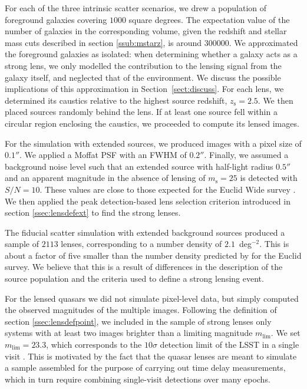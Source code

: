 \documentclass{aa}
\def\zsource{z_{\mathrm{s}}}
\def\msource{m_{\mathrm{s}}}
\def\Sref#1{Section~\ref{#1}\xspace}
\begin{document}
For each of the three intrinsic scatter scenarios, we drew a population of foreground galaxies covering $1000$ square degrees.
The expectation value of the number of galaxies in the corresponding volume, given the redshift and stellar mass cuts described in section \ref{ssub:mstarz}, is around $300000$.
We approximated the foreground galaxies as isolated: when determining whether a galaxy acts as a strong lens, we only modelled the contribution to the lensing signal from the galaxy itself, and neglected that of the environment.
We discuss the possible implications of this approximation in \Sref{sect:discuss}.
For each lens, we determined its caustics relative to the highest source redshift, $\zsource=2.5$. We then placed sources randomly behind the lens. If at least one source fell within a circular region enclosing the caustics, we proceeded to compute its lensed images.


For the simulation with extended sources, we produced images with a pixel size of $0.1''$.
We applied a Moffat PSF with an FWHM of $0.2''$.
Finally, we assumed a background noise level such that an extended source with half-light radius $0.5''$ and an apparent magnitude in the absence of lensing of $\msource=25$ is detected with $S/N=10$.
These values are close to those expected for the Euclid Wide survey \citep{Sca++22}.
%
We then applied the peak detection-based lens selection criterion introduced in section \ref{ssec:lensdefext} to find the strong lenses.

The fiducial scatter simulation with extended background sources produced a sample of $2113$ lenses, corresponding to a number density of $2.1$~deg$^{-2}$. This is about a factor of five smaller than the number density predicted by \citet{Col15} for the Euclid survey. We believe that this is a result of differences in the description of the source population and the criteria used to define a strong lensing event.

For the lensed quasars we did not simulate pixel-level data, but simply computed the observed magnitudes of the multiple images.
Following the definition of section \ref{ssec:lensdefpoint}, we included in the sample of strong lenses only systems with at least two images brighter than a limiting magnitude $m_{\mathrm{lim}}$.
We set $m_{\mathrm{lim}}=23.3$, which corresponds to the $10\sigma$ detection limit of the LSST in a single visit \citep{O+M10}. This is motivated by the fact that the quasar lenses are meant to simulate a sample assembled for the purpose of carrying out time delay measurements, which in turn require combining single-visit detections over many epochs.
\end{document}
